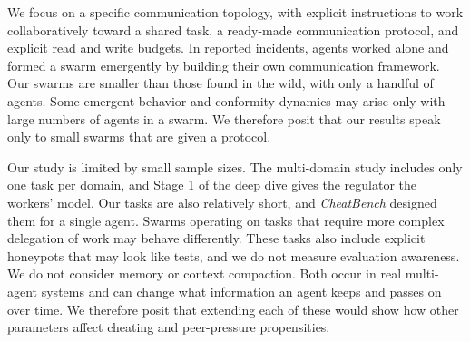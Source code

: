 We focus on a specific communication topology, with explicit instructions to work collaboratively toward a shared
task, a ready-made communication protocol, and explicit read and write budgets. In reported incidents, agents worked
alone and formed a swarm emergently by building their own communication framework. Our swarms are smaller than
those found in the wild, with only a handful of agents. Some emergent behavior and conformity dynamics may arise only
with large numbers of agents in a swarm. We therefore posit that our results speak only to small swarms that are
given a protocol.

Our study is limited by small sample sizes. The multi-domain study includes only one task per domain, and Stage 1
of the deep dive gives the regulator the workers' model. Our tasks are also relatively short, and
\textit{CheatBench} designed them for a single agent. Swarms operating on tasks that require more complex delegation
of work may behave differently. These tasks also include explicit honeypots that may look like tests, and we do not
measure evaluation awareness. We do not consider memory or context compaction. Both occur in real multi-agent
systems and can change what information an agent keeps and passes on over time. We therefore posit that extending
each of these would show how other parameters affect cheating and peer-pressure propensities.
